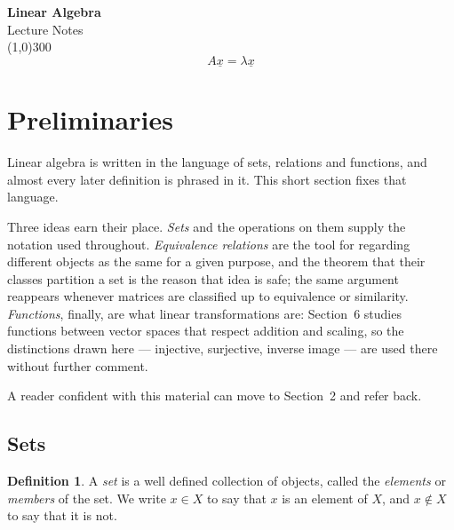 \documentclass[11pt,a4paper]{article}
\theoremstyle{definition}
\newtheorem{defn}[thm]{Definition}
\begin{document}
\begin{titlepage}
\begin{center}
\vspace*{3cm}
{\Huge\bfseries Linear Algebra}\\[1.2cm]
{\large Lecture Notes}\\[2.5cm]
\line(1,0){300}\\[1.5cm]
$$A\underline{x} = \lambda\underline{x}$$
\end{center}
\end{titlepage}

\tableofcontents
\thispagestyle{empty}
\clearpage
\setcounter{page}{1}

\pagebreak

\section{Preliminaries}
Linear algebra is written in the language of sets, relations and functions, and
almost every later definition is phrased in it. This short section fixes that
language.

Three ideas earn their place. \emph{Sets} and the operations on them supply the
notation used throughout. \emph{Equivalence relations} are the tool for
regarding different objects as the same for a given purpose, and the theorem
that their classes partition a set is the reason that idea is safe; the same
argument reappears whenever matrices are classified up to equivalence or
similarity. \emph{Functions}, finally, are what linear transformations are:
Section~6 studies functions between vector spaces that respect addition and
scaling, so the distinctions drawn here --- injective, surjective, inverse
image --- are used there without further comment.

A reader confident with this material can move to Section~2 and refer back.

\subsection{Sets}
\begin{defn}
A \emph{set} is a well defined collection of objects, called the
\emph{elements} or \emph{members} of the set. We write $x\in X$ to say that $x$
is an element of $X$, and $x\notin X$ to say that it is not.
\end{defn}
\end{document}
